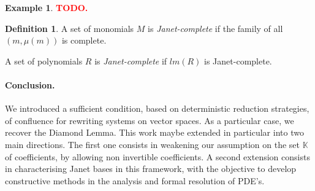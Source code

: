 \documentclass[10pt]{easychair}
\theoremstyle{definition}
\newtheorem{definition}[theorem]{Definition}
\newtheorem{example}[theorem]{Example}
\newcommand\todo[1]{{\bf\textcolor{red}{#1.}}}
\newcommand\K{\mathbb{K}}
\begin{document}
 \begin{example}
\todo{TODO}
 \end{example}

 \begin{definition}
   A set of monomials $M$ is \emph{Janet-complete} if the family of all $(m,\mu(m))$ is complete.

   A set of polynomials $R$ is \emph{Janet-complete} if $lm(R)$ is Janet-complete.
\end{definition}




\paragraph{Conclusion.} We introduced a sufficient condition, based on deterministic reduction strategies, of confluence for rewriting systems on vector spaces. As a particular case, we recover the Diamond Lemma. This work maybe extended in particular into two main directions. The first one consists in weakening our assumption on the set $\K$ of coefficients, by allowing non invertible coefficients. A second extension consists in characterising Janet bases in this framework, with the objective to develop constructive methods in the analysis and formal resolution of PDE's.


\end{document}
